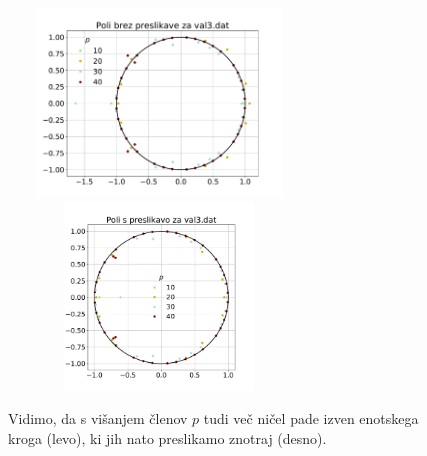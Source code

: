 \documentclass[11pt, a4paper]{article}
\begin{document}
\begin{figure}[H]
\centering
  \includegraphics[width=8cm, height=5cm]{prva_primerjava1.pdf}
  \includegraphics[width=8cm, height=5cm]{prva_primerjava2.pdf}
\caption{Vidimo, da s višanjem členov $p$ tudi več ničel pade izven enotskega kroga (levo), ki jih nato preslikamo znotraj (desno).}  
\end{figure}
\end{document}
